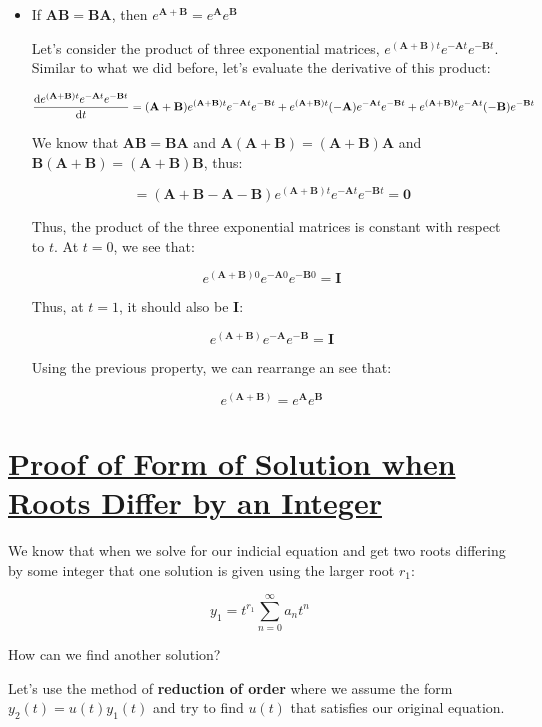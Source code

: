 \documentclass{report}
\begin{document}
{\begin{itemize}
    
    \item If $\mathbf{AB = BA}$, then $e^{\mathbf{A+B}} = e^{\mathbf{A}}e^{\mathbf{B}}$
    
    Let's consider the product of three exponential matrices, $e^{(\mathbf{A+B})t}e^{-\mathbf{A}t}e^{-\mathbf{B}t}$. Similar to what we did before, let's evaluate the derivative of this product:
    
    $$
    \dv{e^{(\mathbf{A+B})t}e^{-\mathbf{A}t}e^{-\mathbf{B}t}}{t} = (\mathbf{A+B})e^{(\mathbf{A+B)}t}e^{-\mathbf{A}t} e^{-\mathbf{B}t}
    + e^{(\mathbf{A+B})t}(-\mathbf{A})e^{-\mathbf{A}t}e^{-\mathbf{B}t}
    + e^{(\mathbf{A+B})t}e^{-\mathbf{A}t}(-\mathbf{B})e^{-\mathbf{B}t}
    $$
    
    We know that $\mathbf{AB = BA}$ and $\mathbf{A(A+B) = (A+B)A}$ and $\mathbf{B(A+B) = (A+B)B}$, thus:
    
    $$
    = (\mathbf{A+B-A-B})e^{(\mathbf{A+B})t}e^{-\mathbf{A}t}e^{-\mathbf{B}t} = \mathbf{0}$$
    
    Thus, the product of the three exponential matrices is constant with respect to $t$. At $t=0$, we see that:
    
    $$e^{(\mathbf{A+B})0}e^{-\mathbf{A}0}e^{-\mathbf{B}0} = \mathbf{I} $$
    
    Thus, at $t=1$, it should also be $\mathbf{I}$:
    
    $$e^{(\mathbf{A+B})}e^{-\mathbf{A}}e^{-\mathbf{B}} = \mathbf{I} $$
    
    Using the previous property, we can rearrange an see that:
    
    $$e^{(\mathbf{A+B})} = e^{\mathbf{A}}e^{\mathbf{B}} $$
    
    
\end{itemize}


\section{\hyperref[th:rootInt]{Proof of Form of Solution when Roots Differ by an Integer}}

\label{sec:prRootInt}


We know that when we solve for our indicial equation and get two roots differing by some integer that one solution is given using the larger root $r_1$:

$$y_1 = t^{r_1}\sum_{n=0}^\infty a_nt^n$$

How can we find another solution?

Let's use the method of \textbf{reduction of order} where we assume the form $y_2(t) = u(t)y_1(t)$ and try to find $u(t)$ that satisfies our original equation.

}
\end{document}
